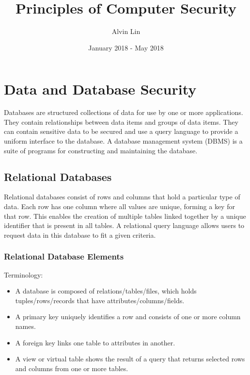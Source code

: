 \documentclass{math}
\title{Principles of Computer Security}
\author{Alvin Lin}
\date{January 2018 - May 2018}
\begin{document}
\maketitle

\section*{Data and Database Security}
Databases are structured collections of data for use by one or more
applications. They contain relationships between data items and groups of data
items. They can contain sensitive data to be secured and use a query language
to provide a uniform interface to the database. A database management system
(DBMS) is a suite of programs for constructing and maintaining the database.

\subsection*{Relational Databases}
Relational databases consist of rows and columns that hold a particular type of
data. Each row has one column where all values are unique, forming a key for
that row. This enables the creation of multiple tables linked together by a
unique identifier that is present in all tables. A relational query language
allows users to request data in this database to fit a given criteria.

\subsubsection*{Relational Database Elements}
Terminology:
\begin{itemize}
  \item A database is composed of relations/tables/files, which holds
  tuples/rows/records that have attributes/columns/fields.
  \item A primary key uniquely identifies a row and consists of one or more
  column names.
  \item A foreign key links one table to attributes in another.
  \item A view or virtual table shows the result of a query that returns
  selected rows and columns from one or more tables.
\end{itemize}
\end{document}
